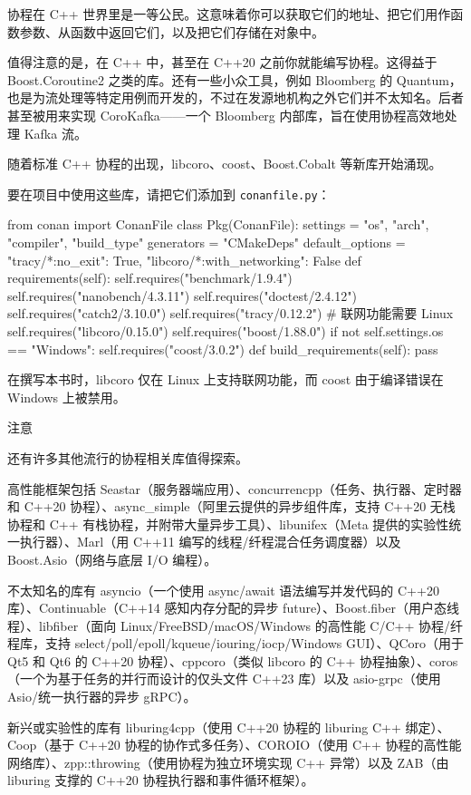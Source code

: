 协程在 C++ 世界里是一等公民。这意味着你可以获取它们的地址、把它们用作函数参数、从函数中返回它们，以及把它们存储在对象中。

\label{idx:1260}
\label{idx:1261}
值得注意的是，在 C++ 中，甚至在 C++20 之前你就能编写协程。这得益于 Boost.Coroutine2 之类的库。还有一些小众工具，例如 Bloomberg 的 Quantum，也是为流处理等特定用例而开发的，不过在发源地机构之外它们并不太知名。后者甚至被用来实现 CoroKafka——一个 Bloomberg 内部库，旨在使用协程高效地处理 Kafka 流。

随着标准 C++ 协程的出现，libcoro、coost、Boost.Cobalt 等新库开始涌现。

要在项目中使用这些库，请把它们添加到 \texttt{conanfile.\allowbreak{}py}：

\begin{codebox}[python]
from conan import ConanFile
class Pkg(ConanFile):
    settings = "os", "arch", "compiler", "build_type"
    generators = "CMakeDeps"
    default_options = {"tracy/*:no_exit": True, "libcoro/*:with_networking": False}
    def requirements(self):
        self.requires("benchmark/1.9.4")
        self.requires("nanobench/4.3.11")
        self.requires("doctest/2.4.12")
        self.requires("catch2/3.10.0")
        self.requires("tracy/0.12.2")
        # 联网功能需要 Linux
        self.requires("libcoro/0.15.0")
        self.requires("boost/1.88.0")
        if not self.settings.os == "Windows":
            self.requires("coost/3.0.2")
    def build_requirements(self):
        pass
\end{codebox}

在撰写本书时，libcoro 仅在 Linux 上支持联网功能，而 coost 由于编译错误在 Windows 上被禁用。

\begin{myNotic}{注意}

还有许多其他流行的协程相关库值得探索。

高性能框架包括 Seastar（服务器端应用）、concurrencpp（任务、执行器、定时器和 C++20 协程）、async\_simple（阿里云提供的异步组件库，支持 C++20 无栈协程和 C++ 有栈协程，并附带大量异步工具）、libunifex（Meta 提供的实验性统一执行器）、Marl（用 C++11 编写的线程/纤程混合任务调度器）以及 Boost.Asio（网络与底层 I/O 编程）。

\label{idx:1262}
不太知名的库有 asyncio（一个使用 async/await 语法编写并发代码的 C++20 库）、Continuable（C++14 感知内存分配的异步 future）、Boost.fiber（用户态线程）、libfiber（面向 Linux/FreeBSD/macOS/Windows 的高性能 C/C++ 协程/纤程库，支持 select/poll/epoll/kqueue/iouring/iocp/Windows GUI）、QCoro（用于 Qt5 和 Qt6 的 C++20 协程）、cppcoro（类似 libcoro 的 C++ 协程抽象）、coros（一个为基于任务的并行而设计的仅头文件 C++23 库）以及 asio-grpc（使用 Asio/统一执行器的异步 gRPC）。

新兴或实验性的库有 liburing4cpp（使用 C++20 协程的 liburing C++ 绑定）、Coop（基于 C++20 协程的协作式多任务）、COROIO（使用 C++ 协程的高性能网络库）、zpp::throwing（使用协程为独立环境实现 C++ 异常）以及 ZAB（由 liburing 支撑的 C++20 协程执行器和事件循环框架）。
\end{myNotic}

